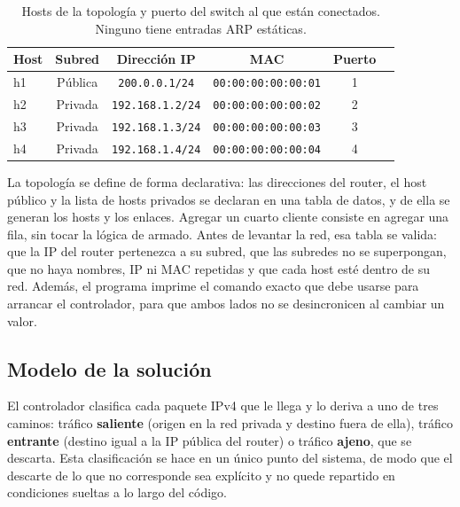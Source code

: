 ﻿\documentclass[10pt,a4paper]{article}
\begin{document}
\begin{table}[H]
\centering
\small
\begin{tabular}{lccccc}
\toprule
\textbf{Host} & \textbf{Subred} & \textbf{Dirección IP} & \textbf{MAC} & \textbf{Puerto} \\
\midrule
h1 & Pública & \texttt{200.0.0.1/24}   & \texttt{00:00:00:00:00:01} & 1 \\
h2 & Privada & \texttt{192.168.1.2/24} & \texttt{00:00:00:00:00:02} & 2 \\
h3 & Privada & \texttt{192.168.1.3/24} & \texttt{00:00:00:00:00:03} & 3 \\
h4 & Privada & \texttt{192.168.1.4/24} & \texttt{00:00:00:00:00:04} & 4 \\
\bottomrule
\end{tabular}
\caption{Hosts de la topología y puerto del switch al que están conectados.
Ninguno tiene entradas ARP estáticas.}
\label{tab:hosts}
\end{table}

La topología se define de forma declarativa: las direcciones del router, el host
público y la lista de hosts privados se declaran en una tabla de datos, y de ella se
generan los hosts y los enlaces. Agregar un cuarto cliente consiste en agregar una
fila, sin tocar la lógica de armado. Antes de levantar la red, esa tabla se valida:
que la IP del router pertenezca a su subred, que las subredes no se superpongan, que
no haya nombres, IP ni MAC repetidas y que cada host esté dentro de su red. Además,
el programa imprime el comando exacto que debe usarse para arrancar el controlador,
para que ambos lados no se desincronicen al cambiar un valor.

\subsection{Modelo de la solución}

El controlador clasifica cada paquete IPv4 que le llega y lo deriva a uno de tres
caminos: tráfico \textbf{saliente} (origen en la red privada y destino fuera de
ella), tráfico \textbf{entrante} (destino igual a la IP pública del router) o tráfico
\textbf{ajeno}, que se descarta. Esta clasificación se hace en un único punto del
sistema, de modo que el descarte de lo que no corresponde sea explícito y no quede
repartido en condiciones sueltas a lo largo del código.
\end{document}
